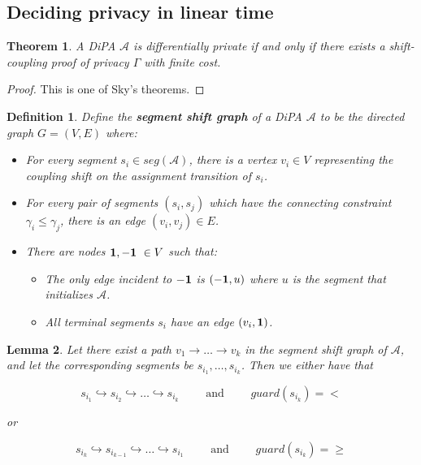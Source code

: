 \documentclass{article}
\newtheorem{theorem}{Theorem}
\newtheorem{definition}{Definition}[section]
\newtheorem{lemma}[theorem]{Lemma}
\newcommand{\1}{\langle 1 \rangle}
\newcommand{\2}{\langle 2 \rangle}
\begin{document}
\subsection{Deciding privacy in linear time}

\begin{theorem}
    A DiPA $\mathcal{A}$ is differentially private if and only if there exists a shift-coupling proof of privacy $\Gamma$ with finite cost. 
\end{theorem}

\begin{proof}
    This is one of Sky's theorems. 
\end{proof}

\begin{definition}
    Define the \textbf{segment shift graph} of a DiPA $\mathcal{A}$ to be the directed graph $G = (V, E)$ where: 

    \begin{itemize}
        \item For every segment $s_i \in seg(\mathcal{A})$, there is a vertex $v_i \in V$ representing the coupling shift on the assignment transition of $s_i$.
        \item For every pair of segments $(s_i, s_j)$ which have the connecting constraint $\gamma_i \leq \gamma_j$, there is an edge $(v_i, v_j) \in E$.
        \item There are nodes ${\bf 1, -1}\ \in V$ such that: 
        \begin{itemize}
            \item The only edge incident to $\bf -1$ is $({\bf -1}, u)$ where $u$ is the segment that initializes $\mathcal{A}$.
            \item All terminal segments $s_i$ have an edge $(v_i, {\bf 1})$.
        \end{itemize}
    \end{itemize}
\end{definition}

\begin{lemma}
    \label{lemma:segpath}
    Let there exist a path $v_1 \to \dots \to v_k$ in the segment shift graph of $\mathcal{A}$, and let the corresponding segments be $s_{i_1}, \dots, s_{i_k}$. Then we either have that 
    
    \[s_{i_1} \hookrightarrow s_{i_2} \hookrightarrow \dots \hookrightarrow s_{i_k} \qquad \text{ and } \qquad guard(s_{i_k}) = <\]
    
    or 
    
    \[s_{i_k} \hookrightarrow s_{i_{k - 1}} \hookrightarrow \dots \hookrightarrow s_{i_1} \qquad \text{ and } \qquad guard(s_{i_k}) = \geq\]
\end{lemma}
\end{document}
